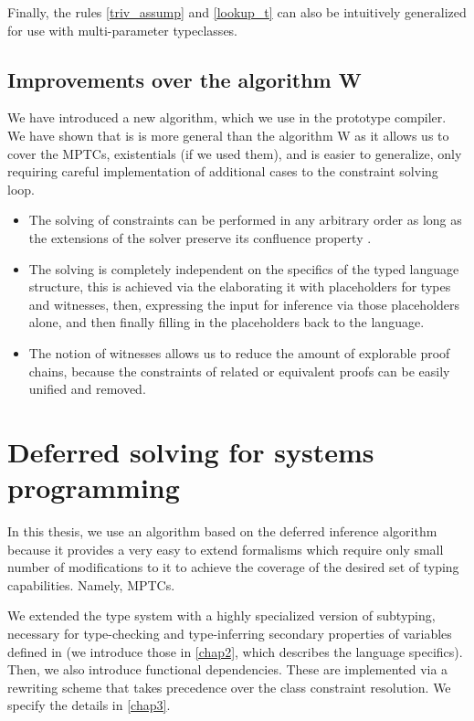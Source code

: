 Finally, the rules \ref{triv_assump} and \ref{lookup_t} can also be intuitively generalized for use with multi-parameter typeclasses.

\subsection{Improvements over the algorithm W}

We have introduced a new algorithm, which we use in the prototype compiler. We have shown that is is more general than the algorithm W as it allows us to cover the MPTCs, existentials (if we used them), and is easier to generalize, only requiring careful implementation of additional cases to the constraint solving loop.

\begin{itemize}
    \item  The solving of constraints can be performed in any arbitrary order as long as the extensions of the solver preserve its confluence property \cite{vytiniotis2011outsidein}.

    \item The solving is completely independent on the specifics of the typed language structure, this is achieved via the elaborating it with placeholders for types and witnesses, then, expressing the input for inference via those placeholders alone, and then finally filling in the placeholders back to the language.

    \item The notion of witnesses allows us to reduce the amount of explorable proof chains, because the constraints of related or equivalent proofs can be easily unified and removed.
\end{itemize}

\section{Deferred solving for systems programming}
\label{sys_defer}

In this thesis, we use an algorithm based on the deferred inference algorithm because it provides a very easy to extend formalisms which require only small number of modifications to it to achieve the coverage of the desired set of typing capabilities. Namely, MPTCs.

We extended the type system with a highly specialized version of subtyping, necessary for type-checking and type-inferring secondary properties of variables defined in \cmm (we introduce those in \cref{chap2}, which describes the language specifics). Then, we also introduce functional dependencies. These are implemented via a rewriting scheme that takes precedence over the class constraint resolution. We specify the details in \cref{chap3}.

